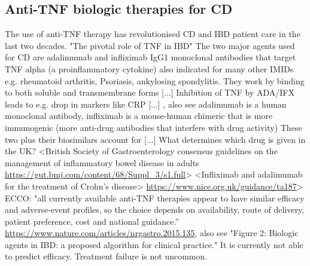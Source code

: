 \begin{outline}
\subsection{Anti-TNF biologic therapies for CD}

\1 The use of \gls{anti-TNF} therapy has revolutionised CD and IBD patient care in the last two decades.
\2 "The pivotal role of TNF in IBD" \autocite{digby-bell2019InterrogatingHostImmunity}
    \2 The two major agents used for CD are adalimumab and infliximab IgG1 monoclonal antibodies that target TNF alpha (a proinflammatory cytokine) \autocite{adegbola2018AntiTNFTherapyCrohn}
        \3 also indicated for many other IMIDs e.g. rheumatoid arthritis, Psoriasis, ankylosing spondylitis. \autocite{lichtenstein2013ComprehensiveReviewAntitumor,mulhearn2019UsingImmunophenotypePredict}
        \2 They work by binding to both soluble and transmembrane forms \autocite{lichtenstein2013ComprehensiveReviewAntitumor} [...]  \autocite{levin2016MechanismActionAntiTNF} 
    \2 Inhibition of TNF by ADA/IFX leads to e.g. drop in markers like CRP [...]  \autocite{levin2016MechanismActionAntiTNF}, also see \autocite{danese2015BiologicAgentsIBD,adegbola2018AntiTNFTherapyCrohn}
    \2 adalimumab is a human monoclonal antibody, infliximab is a mouse-human chimeric that is more immunogenic (more anti-drug antibodies that interfere with drug activity)
        \3 These two plus their biosimilars account for [...] 
    \2 What determines which drug is given in the UK? 
        \3 <British Society of Gastroenterology consensus guidelines on the management of inflammatory bowel disease in adults \url{https://gut.bmj.com/content/68/Suppl_3/s1.full}>
        \3 <Infliximab and adalimumab for the treatment of Crohn's disease> \url{https://www.nice.org.uk/guidance/ta187}>
         ECCO: "all currently available anti-TNF therapies appear to have similar efficacy and adverse-event profiles, so the choice depends on availability, route of delivery, patient preference, cost and national guidance.” \url{https://www.nature.com/articles/nrgastro.2015.135}, also see "Figure 2: Biologic agents in IBD: a proposed algorithm for clinical practice."
    \2 It is currently not able to predict efficacy. Treatment failure is not uncommon.


\end{outline}
